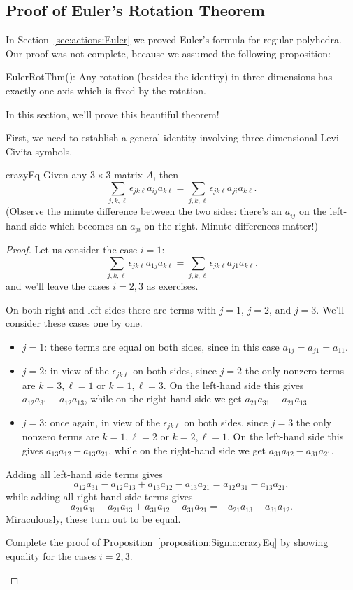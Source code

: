 \subsection{Proof of Euler's Rotation Theorem}\label{subsec:EulerRot}

In Section~\ref{sec:actions:Euler} we proved Euler's formula for regular polyhedra. Our proof was not complete, because we assumed the following proposition:

\begin{prop}{EulerRotThm}(): Any rotation (besides the identity) in three dimensions has exactly one axis which is fixed by the rotation.
\end{prop}

In this section, we'll prove this beautiful theorem!

First, we need to establish a general identity involving three-dimensional Levi-Civita symbols.

\begin{prop}{crazyEq} Given any $3 \times 3$ matrix $A$, then 
\[ \sum_{j,k,\ell}\epsilon_{jk\ell} a_{ij}a_{k\ell} =  \sum_{j,k,\ell}\epsilon_{jk\ell} a_{ji}a_{k\ell}. \]
(Observe the minute difference between the two sides:  there's an $a_{ij}$ on the left-hand side which becomes an $a_{ji}$ on the right. Minute differences matter!)
\end{prop}
\begin{proof}
Let us consider the case $i=1$:
\[ \sum_{j,k,\ell}\epsilon_{jk\ell} a_{1j}a_{k\ell} =  \sum_{j,k,\ell}\epsilon_{jk\ell} a_{j1}a_{k\ell}. \]
 and we'll leave the cases $i=2,3$ as exercises.

On both right and left sides there are terms with $j=1$, $j=2$, and $j=3$.  We'll consider these cases one by one.
\begin{itemize}
\item
$j=1$: these terms are equal on both sides, since in this case $a_{1j}=a_{j1}=a_{11}$.
\item
$j=2$: in view of the $\epsilon_{jk\ell}$ on both sides, since $j=2$ the only nonzero terms are $k=3, \ell=1$  or $k=1, \ell = 3$.  On the left-hand side this gives $a_{12}a_{31} - a_{12}a_{13}$, while on the right-hand side we get $a_{21}a_{31} - a_{21}a_{13}$
\item
$j=3$: once again, in view of the $\epsilon_{jk\ell}$ on both sides, since $j=3$ the only nonzero terms are $k=1, \ell=2$  or $k=2, \ell = 1$.  On the left-hand side this gives $a_{13}a_{12} - a_{13}a_{21}$, while on the right-hand side we get $a_{31}a_{12} - a_{31}a_{21}$.
\end{itemize}
Adding all left-hand side terms gives
\[ a_{12}a_{31} - a_{12}a_{13} + a_{13}a_{12} - a_{13}a_{21} = a_{12}a_{31}  - a_{13}a_{21},\]
while adding all right-hand side terms gives
\[a_{21}a_{31} - a_{21}a_{13} + a_{31}a_{12} - a_{31}a_{21} = - a_{21}a_{13} + a_{31}a_{12}.\]
Miraculously, these turn out to be equal.

\begin{exercise}{} Complete the proof of Proposition~\ref{proposition:Sigma:crazyEq} by showing equality for the cases $i=2,3$.
\end{exercise}
\end{proof}

